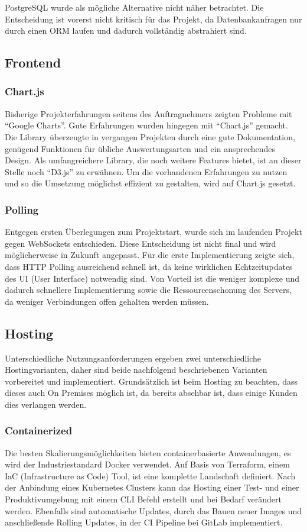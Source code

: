 PostgreSQL wurde als mögliche Alternative nicht näher betrachtet.
Die Entscheidung ist vorerst nicht kritisch für das Projekt, da Datenbankanfragen nur durch einen ORM laufen und dadurch vollständig abstrahiert sind.
\newpage

\subsection{Frontend}

\subsubsection{Chart.js}
Bisherige Projekterfahrungen seitens des Auftragnehmers zeigten Probleme mit \enquote{Google Charts}.
Gute Erfahrungen wurden hingegen mit \enquote{Chart.js} gemacht.
Die Library überzeugte in vergangen Projekten durch eine gute Dokumentation, genügend Funktionen für übliche Auswertungsarten und ein ansprechendes Design.
Als umfangreichere Library, die noch weitere Features bietet, ist an dieser Stelle noch \enquote{D3.js} zu erwähnen.
Um die vorhandenen Erfahrungen zu nutzen und so die Umsetzung möglichst effizient zu gestalten, wird auf Chart.js gesetzt.

\subsubsection{Polling}
Entgegen ersten Überlegungen zum Projektstart, wurde sich im laufenden Projekt gegen WebSockets entschieden.
Diese Entscheidung ist nicht final und wird möglicherweise in Zukunft angepasst.
Für die erste Implementierung zeigte sich, dass HTTP Polling ausreichend schnell ist, da keine wirklichen Echtzeitupdates des UI (User Interface) notwendig sind.
Von Vorteil ist die weniger komplexe und dadurch schnellere Implementierung sowie die Ressourcenschonung des Servers, da weniger Verbindungen offen gehalten werden müssen.

\subsection{Hosting}
Unterschiedliche Nutzungsanforderungen ergeben zwei unterschiedliche Hostingvarianten, daher sind beide nachfolgend beschriebenen Varianten vorbereitet und implementiert.
Grundsätzlich ist beim Hosting zu beachten, dass dieses auch On Premises möglich ist, da bereits absehbar ist, dass einige Kunden dies verlangen werden.

\subsubsection{Containerized}
Die besten Skalierungsmöglichkeiten bieten containerbasierte Anwendungen, es wird der Industriestandard Docker verwendet.
Auf Basis von Terraform, einem IaC (Infrastructure as Code) Tool, ist eine komplette Landschaft definiert.
Nach der Anbindung eines Kubernetes Clusters kann das Hosting einer Test- und einer Produktivumgebung mit einem CLI Befehl erstellt und bei Bedarf verändert werden.
Ebenfalls sind automatische Updates, durch das Bauen neuer Images und anschließende Rolling Updates, in der CI Pipeline bei GitLab implementiert.

